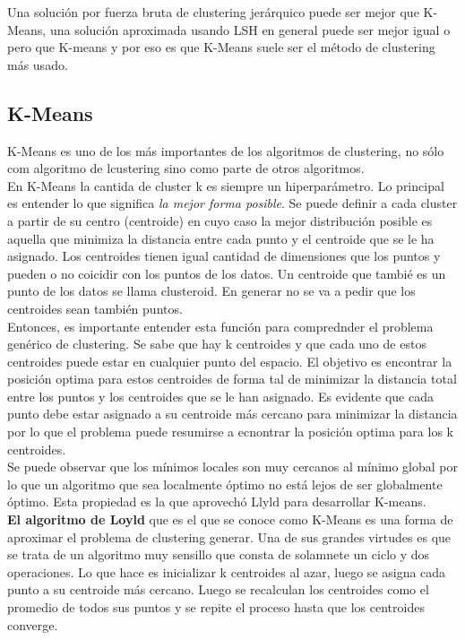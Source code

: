 \documentclass[titlepage,a4paper]{article}
\begin{document}
Una solución por fuerza bruta de clustering jerárquico puede ser mejor que K-Means, una solución aproximada usando LSH en general puede ser mejor igual o pero que K-means y por eso es que K-Means suele ser el método de clustering más usado. 

\subsection*{K-Means}
K-Means es uno de los más importantes de los algoritmos de clustering, no sólo com algoritmo de lcustering sino como parte de otros algoritmos. \\

En K-Means la cantida de cluster k es siempre un hiperparámetro. Lo principal es entender lo que significa \textit{la mejor forma posible}. Se puede definir a cada cluster a partir de su centro (centroide) en cuyo caso la mejor distribución posible es aquella que minimiza la distancia entre cada punto y el centroide que se le ha asignado. Los centroides tienen igual cantidad de dimensiones que los puntos y pueden o no coicidir con los puntos de los datos. Un centroide que tambié es un punto de los datos se llama clusteroid. En generar no se va a pedir que los centroides sean también puntos. \\

Entonces, es importante entender esta función para comprednder el problema genérico de clustering. Se sabe que hay k centroides y que cada uno de estos centroides puede estar en cualquier punto del espacio. El objetivo es encontrar la posición optima para estos centroides de forma tal de minimizar la distancia total entre los puntos y los centroides que se le han asignado. Es evidente que cada punto debe estar asignado a su centroide más cercano para minimizar la distancia por lo que el problema puede resumirse a ecnontrar la posición optima para los k centroides. \\

Se puede observar que los mínimos locales son muy cercanos al mínimo global por lo que un algoritmo que sea localmente óptimo no está lejos de ser globalmente óptimo. Esta propiedad es la que aprovechó Llyld para desarrollar K-means. \\

\textbf{El algoritmo de Loyld} que es el que se conoce como K-Means es una forma de aproximar el problema de clustering generar. Una de sus grandes virtudes es que se trata de un algoritmo muy sensillo que consta de solamnete un ciclo y dos operaciones. Lo que hace es inicializar k centroides al azar, luego se asigna cada punto a su centroide más cercano. Luego se recalculan los centroides como el promedio de todos sus puntos y se repite el proceso hasta que los centroides converge. \\
\end{document}
